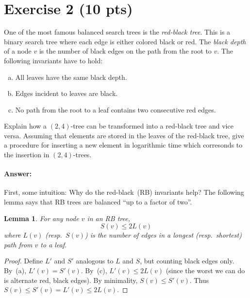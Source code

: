 \documentclass[a4paper]{article}
\newtheorem{mylemma}{\textbf{Lemma}}
\begin{document}
\section{Exercise 2 (10 pts)}

One of the most famous balanced search trees is the \emph{red-black tree}.
This is a binary search tree where each edge is either colored black or red.
The \emph{black depth} of a node $v$ is the number of black edges on the path from the root to $v$.
The following invariants have to hold:
\begin{enumerate}[a)]
\item All leaves have the same black depth.
\item Edges incident to leaves are black.
\item No path from the root to a leaf contains two consecutive red edges.
\end{enumerate}

Explain how a $(2,4)$-tree can be transformed into a red-black tree and vice versa.
Assuming that elements are stored in the leaves of the red-black tree, give a procedure for inserting a new element in logarithmic time which corresonds to the insertion in $(2,4)$-trees.

\paragraph{Answer:}

First, some intuition:
Why do the red-black~(RB) invariants help?
The following lemma says that RB trees are balanced ``up to a factor of two''.

\begin{mylemma}
	For any node $v$ in an RB tree,
	\[
		S(v) \le 2L(v)
	\]
	where $L(v)$ (resp.\ $S(v)$) is the number of edges in a longest (resp.\ shortest) path from $v$ to a leaf.
\end{mylemma}

\begin{proof}
	Define $L'$ and $S'$ analogous to $L$ and $S$, but counting black edges only.
	By~(a), $L'(v) = S'(v)$.
	By~(c), $L'(v) \le 2L(v)$ (since the worst we can do is alternate red, black edges).
	By minimality, $S(v) \le S'(v)$.
	Thus $S(v) \le S'(v) = L'(v) \le 2L(v)$.
\end{proof}
\end{document}
